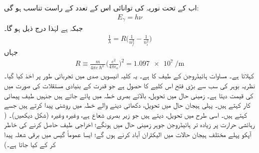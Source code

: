 اب  کے تحت نوریہ کی توانائی اس کے تعدد کے راست تناسب ہو گی:
\begin{align}
E_{\gamma}=h\nu
\end{align}
جبکہ   ہے لہٰذا درج ذیل ہو گا۔
\begin{align}\label{مساوات_تین_ابعادی_رڈبرگ_کلیہ}
\frac{1}{\lambda}=R\big(\frac{1}{n^{2}_{f}}-\frac{1}{n^{2}_{i}}\big)
\end{align}
جہاں 
\begin{align}
R\equiv \frac{m}{4\pi{c}\hslash^{3}}\big(\frac{e^{2}}{4\pi\epsilon_{o}}\big)^{2}=\SI{1.097e7}{\per\meter}
\end{align}
 کہلاتا ہے۔ مساوات  ہائیڈروجن کے طیف کا  ہے۔ یہ کلیہ انیسویں صدی میں تجرباتی طور پر اخذ کیا گیا۔نظریہ بوہر کی سب سے بڑی فتح اس کلیے کا حصول ہے جو قدرت کے بنیادی مستقلات کی صورت میں  کی قیمت دیتا ہے۔ زمینی حال  میں تحویل، بالائے بصری خطہ میں پائے جاتے ہیں جنہیں طیف پیمائی کار  کہتے ہیں۔ پہلی ہیجان حال 
میں تحویل، دکھائی دینے والے خطہ میں روشنی پیدا کرتے ہیں جسے  کہتے ہیں۔ اسی طرح  میں تحویل،  دیتے ہیں جو زیر بصری شعاع ہے، وغیرہ وغیرہ (شکل  دیکھیں)۔ ( رہائشی حرارت پر زیادہ تر ہائیڈروجن جوہر زمینی حال میں ہونگے؛ اخراجی طیف حاصل کرنے کی خاطر آپکو پہلے مختلف ہیجان حالات میں الیکٹران آباد کرنے ہوں گے؛ ایسا عموماً گیس میں برقی شعلہ پیدا کر کے کیا جاتا ہے۔)


